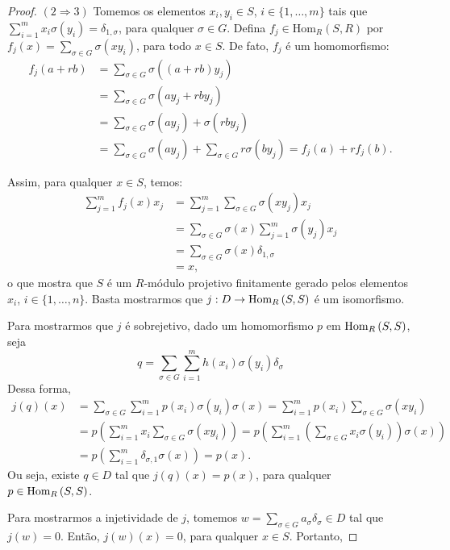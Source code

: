 \begin{teo}
\begin{proof}
$(2\Rightarrow 3)$ 
Tomemos os elementos $x_i,y_i\in S$, $i\in \{1,\dots,m\}$ tais que $\sum_{i=1}^mx_i\sigma(y_i)=\delta_{1,\sigma}$, para qualquer $\sigma\in G$. Defina $f_j\in \textrm{Hom}_R(S,R)$ por $f_j(x)=\sum_{\sigma\in G}\sigma(xy_i)$, para todo $x \in S$. De fato, $f_j$ é um homomorfismo:
\begin{align*}
        f_j(a+rb) &= \sum_{\sigma\in G}\sigma((a+rb)y_j) \\
        &= \sum_{\sigma\in G}\sigma(ay_j +rby_j) \\
        &= \sum_{\sigma\in G}\sigma(ay_j)+\sigma(rby_j) \\
        &= \sum_{\sigma\in G}\sigma(ay_j)+\sum_{\sigma\in G}r\sigma(by_j) = f_j(a)+rf_j(b).
\end{align*} \par
Assim, para qualquer $x\in S$, temos:
\begin{align*}
        \sum_{j=1}^{m}f_j(x)x_j &=\sum_{j=1}^{m}\sum_{\sigma\in G}\sigma(xy_j)x_j \\
        &= \sum_{\sigma\in G}\sigma(x)\sum_{j=1}^{m} \sigma(y_j)x_j \\
        &= \sum_{\sigma\in G}\sigma(x) \delta_{1,\sigma} \\
        &= x,
\end{align*}
o que mostra que $S$ é um $R$-módulo projetivo finitamente gerado pelos elementos $x_i$, $i\in \{1,\dots,n\}$. Basta mostrarmos que $j: D \rightarrow \textrm{Hom}_{R}\left( S,S \right)$ é um isomorfismo. \par 
Para mostrarmos que $j$ é sobrejetivo, dado um homomorfismo $p$ em $\textrm{Hom}_{R}\left( S,S \right)$, seja
\[q= \sum_{\sigma \in G} \sum_{i=1}^{m} h(x_i)\sigma(y_i)\delta_\sigma\]
Dessa forma,
\begin{align*}
        j(q)(x) &= \sum_{\sigma \in G} \sum_{i=1}^{m} p(x_i)\sigma(y_i)\sigma(x) = \sum_{i=1}^{m} p(x_i) \sum_{\sigma \in G} \sigma(xy_i) \\
        &= p\left(\sum_{i=1}^{m} x_i \sum_{\sigma \in G} \sigma(xy_i)\right) = p\left(\sum_{i=1}^{m} \left(\sum_{\sigma \in G} x_i\sigma(y_i) \right) \sigma(x)\right) \\
        &= p\left( \sum_{i=1}^{m} \delta_{\sigma,1} \sigma(x)\right) = p(x).
\end{align*}
Ou seja, existe $q \in D$ tal que $j(q)(x)=p(x)$, para qualquer $p \in \textrm{Hom}_{R}\left( S,S \right)$. \par
Para mostrarmos a injetividade de $j$, tomemos $w=\sum_{\sigma\in G}a_\sigma \delta_\sigma \in D$ tal que $j(w)=0$. Então, $j(w)(x)=0$, para qualquer $x \in S$. Portanto,


\end{proof}
\end{teo}
